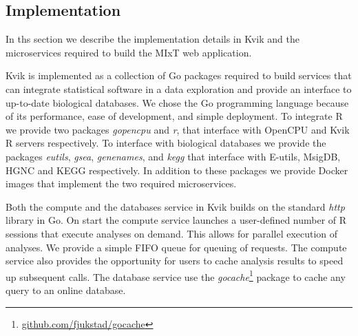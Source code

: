 

\subsection*{Implementation}
In ths section we describe the implementation details in Kvik and the
microservices required to build the MIxT web application. 

Kvik is implemented as a collection of Go packages required to build services
that can integrate statistical
software in a data exploration and provide an interface to up-to-date biological
databases. We chose the Go programming language because of its performance, ease
of development, and simple deployment. 
To integrate R we provide two packages \emph{gopencpu} and
\emph{r}, that interface with OpenCPU and Kvik R servers respectively. To
interface with biological databases we provide the packages \emph{eutils},
\emph{gsea}, \emph{genenames}, and \emph{kegg} that interface with E-utils,
MsigDB, HGNC and KEGG respectively.
In addition to these packages we provide Docker images that implement the
two required microservices. 

Both the compute and the databases service in Kvik builds on the standard
\emph{http} library in Go. On start the compute service 
launches a user-defined number of R sessions that execute analyses on demand.
This allows for parallel execution of analyses. We provide a simple FIFO queue
for queuing of requests. The compute service also provides the opportunity for users to
cache analysis results to speed up subsequent calls. The database service use
the \emph{gocache}\footnote{\url{github.com/fjukstad/gocache}} package to cache
any query to an online database.

% 
% 
% 
% 
% 
